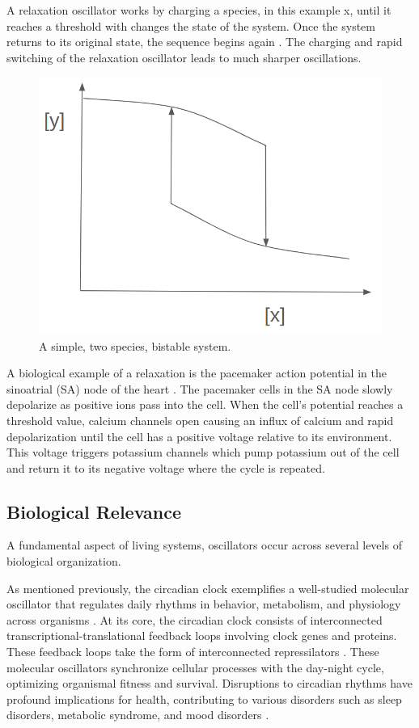 \documentclass[12pt]{report}
\begin{document}
A relaxation oscillator works by charging a species, in this example x, until it reaches a threshold with changes the state of the system. Once the system returns to its original state, the sequence begins again \cite{sauro_network_2009}. The charging and rapid switching of the relaxation oscillator leads to much sharper oscillations.

\begin{figure}
    \centering
    \includegraphics[width=12cm]{images/bistability.png}
    \caption[A simple bistable system]{A simple, two species, bistable system.}
    \label{fig:bistability}
\end{figure}

A biological example of a relaxation is the pacemaker action potential in the sinoatrial (SA) node of the heart \cite{SAnode}. The pacemaker cells in the SA node slowly depolarize as positive ions pass into the cell. When the cell's potential reaches a threshold value, calcium channels open causing an influx of calcium and rapid depolarization until the cell has a positive voltage relative to its environment. This voltage triggers potassium channels which pump potassium out of the cell and return it to its negative voltage where the cycle is repeated.

\subsection{Biological Relevance}
A fundamental aspect of living systems, oscillators occur across several levels of biological organization. 

As mentioned previously, the circadian clock exemplifies a well-studied molecular oscillator that regulates daily rhythms in behavior, metabolism, and physiology across organisms \cite{circadianReview, circadianOverview}. At its core, the circadian clock consists of interconnected transcriptional-translational feedback loops involving clock genes and proteins. These feedback loops take the form of interconnected repressilators \cite{YAMASHINO2013, Pett2016}. These molecular oscillators synchronize cellular processes with the day-night cycle, optimizing organismal fitness and survival. Disruptions to circadian rhythms have profound implications for health, contributing to various disorders such as sleep disorders, metabolic syndrome, and mood disorders \cite{circadianReview}.
\end{document}
